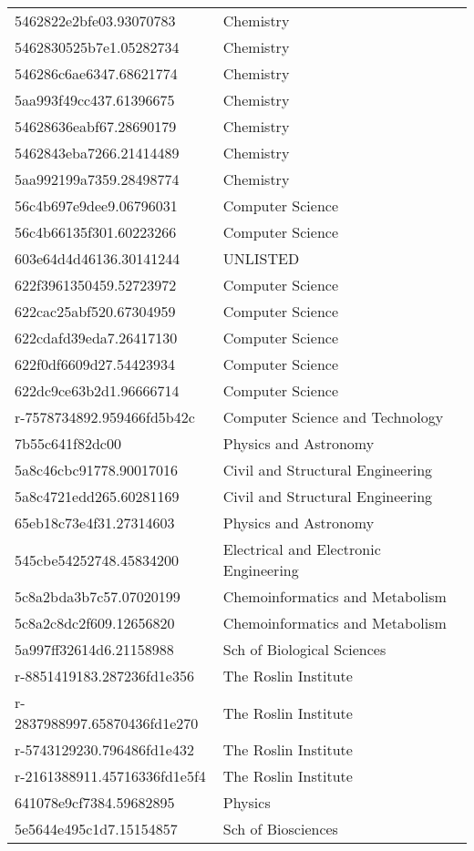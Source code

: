 \begin{tabular}{ll}
5462822e2bfe03.93070783 & Chemistry \\
5462830525b7e1.05282734 & Chemistry \\
546286c6ae6347.68621774 & Chemistry \\
5aa993f49cc437.61396675 & Chemistry \\
54628636eabf67.28690179 & Chemistry \\
5462843eba7266.21414489 & Chemistry \\
5aa992199a7359.28498774 & Chemistry \\
56c4b697e9dee9.06796031 & Computer Science \\
56c4b66135f301.60223266 & Computer Science \\
603e64d4d46136.30141244 & UNLISTED \\
622f3961350459.52723972 & Computer Science \\
622cac25abf520.67304959 & Computer Science \\
622cdafd39eda7.26417130 & Computer Science \\
622f0df6609d27.54423934 & Computer Science \\
622dc9ce63b2d1.96666714 & Computer Science \\
r-7578734892.959466fd5b42c & Computer Science and Technology \\
7b55c641f82dc00 & Physics and Astronomy \\
5a8c46cbc91778.90017016 & Civil and Structural Engineering \\
5a8c4721edd265.60281169 & Civil and Structural Engineering \\
65eb18c73e4f31.27314603 & Physics and Astronomy \\
545cbe54252748.45834200 & Electrical and Electronic Engineering \\
5c8a2bda3b7c57.07020199 & Chemoinformatics and Metabolism \\
5c8a2c8dc2f609.12656820 & Chemoinformatics and Metabolism \\
5a997ff32614d6.21158988 & Sch of Biological Sciences \\
r-8851419183.287236fd1e356 & The Roslin Institute \\
r-2837988997.65870436fd1e270 & The Roslin Institute \\
r-5743129230.796486fd1e432 & The Roslin Institute \\
r-2161388911.45716336fd1e5f4 & The Roslin Institute \\
641078e9cf7384.59682895 & Physics \\
5e5644e495c1d7.15154857 & Sch of Biosciences \\

\end{tabular}
